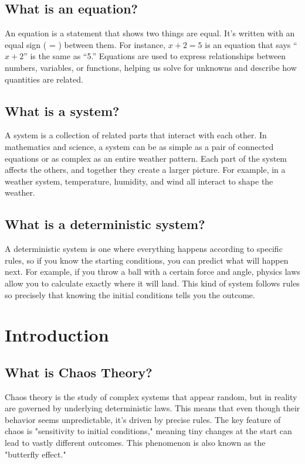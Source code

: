 \documentclass[12pt]{article}
\begin{document}
\subsection{What is an equation?}
An equation is a statement that shows two things are equal. It’s written with an equal sign ( = ) between them. For instance, \( x + 2 = 5 \) is an equation that says “\( x + 2 \)” is the same as “5.” Equations are used to express relationships between numbers, variables, or functions, helping us solve for unknowns and describe how quantities are related.

\subsection{What is a system?}
A system is a collection of related parts that interact with each other. In mathematics and science, a system can be as simple as a pair of connected equations or as complex as an entire weather pattern. Each part of the system affects the others, and together they create a larger picture. For example, in a weather system, temperature, humidity, and wind all interact to shape the weather.

\subsection{What is a deterministic system?}
A deterministic system is one where everything happens according to specific rules, so if you know the starting conditions, you can predict what will happen next. For example, if you throw a ball with a certain force and angle, physics laws allow you to calculate exactly where it will land. This kind of system follows rules so precisely that knowing the initial conditions tells you the outcome.

\section{Introduction}

\subsection{What is Chaos Theory?}

Chaos theory is the study of complex systems that appear random, but in reality are governed by underlying deterministic laws. This means that even though their behavior seems unpredictable, it's driven by precise rules. The key feature of chaos is "sensitivity to initial conditions," meaning tiny changes at the start can lead to vastly different outcomes. This phenomenon is also known as the "butterfly effect."
\end{document}

